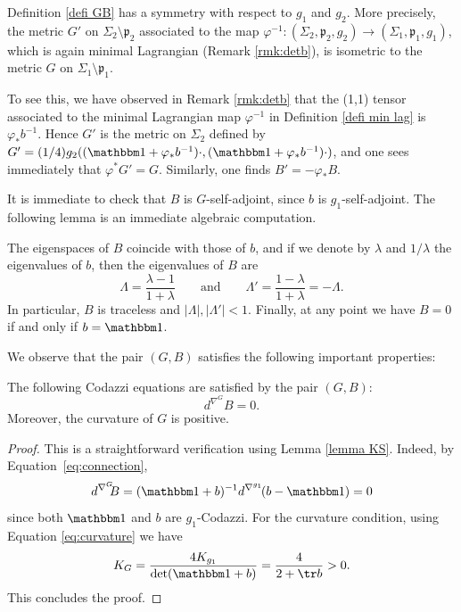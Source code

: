 \begin{remark}\label{rmk inverse 2}
Definition \ref{defi GB} has a symmetry with respect to $g_1$ and $g_2$. More precisely, the metric $G'$ on $\Sigma_2\setminus \mathfrak p_2$ associated to the map $\varphi^{-1}:(\Sigma_2,\mathfrak p_2,g_2)\to (\Sigma_1,\mathfrak p_1,g_1)$, which is again minimal Lagrangian (Remark \ref{rmk:detb}), is isometric to the metric $G$ on $\Sigma_1\setminus \mathfrak p_1$.

To see this, we have observed in Remark \ref{rmk:detb} that the (1,1) tensor associated to the minimal Lagrangian map $\varphi^{-1}$ in Definition \ref{defi min lag} is $\varphi_*b^{-1}$. Hence $G'$ is the metric on $\Sigma_2$ defined by $G'=(1/4)g_2((\mathbbm 1+\varphi_*b^{-1})\cdot,(\mathbbm 1+\varphi_*b^{-1})\cdot)$, and one sees immediately that $\varphi^*G'=G$. Similarly, one finds $B'=-\varphi_*B$.
\end{remark}

It is immediate to check that $B$ is $G$-self-adjoint, since $b$ is $g_1$-self-adjoint. The following lemma is an immediate algebraic computation.

\begin{lemma} \label{prop eigenvalues}
The eigenspaces of $B$ coincide with those of $b$, and if we denote by $\lambda$ and $1/\lambda$ the eigenvalues of $b$, then the eigenvalues of $B$ are
\[
\Lambda=\frac{\lambda-1}{1+\lambda}\qquad\text{and}\qquad \Lambda'=\frac{1-\lambda}{1+\lambda}=-\Lambda.
\]
In particular, $B$ is traceless and $|\Lambda|,|\Lambda'|<1$. Finally, at any point we have $B=0$ if and only if $b=\mathbbm 1$.
\end{lemma}

We observe that the pair $(G,B)$ satisfies the following important properties:

\begin{prop}\label{prop GCS3}
The following Codazzi equations are satisfied by the pair $(G,B)$:
\[
d^{\nabla^G}\!\!B=0.
\]
Moreover, the curvature of $G$ is positive.
\end{prop}
\begin{proof}
This is a straightforward verification using Lemma \ref{lemma KS}. Indeed, by Equation~\eqref{eq:connection},
\[
d^{\nabla^G}\!\!B=(\mathbbm 1+b)^{-1}d^{\nabla^{g_1}}\!(b-\mathbbm 1)=0
\]
since both $\mathbbm 1$ and $b$ are $g_1$-Codazzi. For the curvature condition, using Equation \eqref{eq:curvature} we have
\[
K_G=\frac{4K_{g_1}}{\det(\mathbbm 1+b)}=\frac{4}{2+\tr b}>0.
\]
This concludes the proof.
\end{proof}

